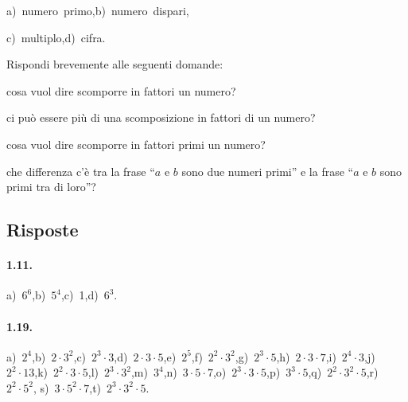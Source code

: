 \begin{multicols}{2}
\begin{esercizio}
a)~numero~primo,\quad b)~numero~dispari,

c)~multiplo,\quad d)~cifra.
\end{esercizio}

\begin{esercizio}
Rispondi brevemente alle seguenti domande:
 \begin{enumeratea}
 \item cosa vuol dire scomporre in fattori un numero?
 \item ci può essere più di una scomposizione in fattori di un numero?
 \item cosa vuol dire scomporre in fattori primi un numero?
 \item che differenza c'è tra la frase ``$a$ e $b$ sono due numeri primi'' e la frase ``$a$ e $b$ sono primi tra di loro''?
 \end{enumeratea}
\end{esercizio}
\end{multicols}

\subsection{Risposte}

\paragraph{1.11.}
a)~$6^6$,\quad b)~$5^4$,\quad c)~1,\quad d)~$6^3$.

\paragraph{1.19.}
a)~$2^4$,\quad b)~$ 2\cdot 3^2 $,\quad c)~$ 2^3 \cdot 3 $,\quad d)~$ 2\cdot 3\cdot 5 $,\quad e)~$ 2^5 $,\quad f)~$ 2^2 \cdot 3^2 $,\quad g)~$ 2^3 \cdot 5 $,\quad h)~$ 2\cdot 3\cdot 7 $,\quad i)~$ 2^4 \cdot 3 $,\quad j)~$ 2^2 \cdot 13 $,\quad k)~$ 2^2 \cdot 3 \cdot5 $,\quad l)~$ 2^3 \cdot 3^2 $,\quad m)~$ 3^4 $,\quad n)~$ 3\cdot 5\cdot 7 $,\quad o)~$ 2^3 \cdot 3\cdot 5 $,\quad p)~$ 3^3 \cdot 5 $,\quad q)~$ 2^2 \cdot 3^2 \cdot 5 $,\quad r)~$ 2^2 \cdot 5^2 $, s)~$3\cdot5^2\cdot7$,\quad t)~$ 2^3 \cdot 3^2 \cdot5$.

